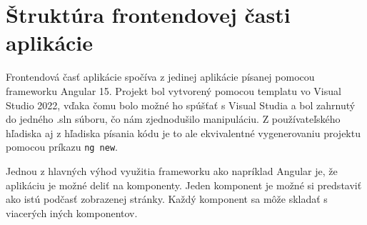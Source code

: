 \section{Štruktúra frontendovej časti aplikácie}
Frontendová časť aplikácie spočíva z jedinej aplikácie písanej pomocou frameworku Angular 15. Projekt bol vytvorený pomocou templatu vo Visual Studio 2022, vďaka čomu bolo možné ho 
spúšťať s Visual Studia a bol zahrnutý do jedného .sln súboru, čo nám zjednodušilo manipuláciu. Z používateľského hľadiska aj z hľadiska písania kódu je to ale ekvivalentné 
vygenerovaniu projektu pomocou príkazu \lstinline{ng new}.

Jednou z hlavných výhod využitia frameworku ako napríklad Angular je, že aplikáciu je možné deliť na komponenty. Jeden komponent je možné si predstaviť ako istú podčasť zobrazenej stránky. 
Každý komponent sa môže skladať s viacerých iných komponentov. 